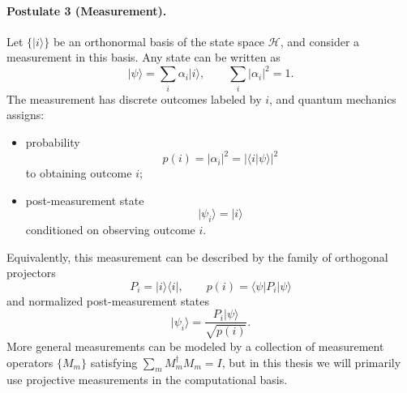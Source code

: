 \documentclass[12pt,a4paper,openany]{report}
\begin{document}
\paragraph{Postulate 3 (Measurement).}
Let $\{\lvert i \rangle\}$ be an orthonormal basis of the state space $\mathcal{H}$, and consider a measurement in this basis. Any state can be written as
\begin{equation}
  \lvert \psi \rangle = \sum_i \alpha_i \lvert i \rangle, \qquad \sum_i \lvert \alpha_i \rvert^2 = 1.
\end{equation}
The measurement has discrete outcomes labeled by $i$, and quantum mechanics assigns:
\begin{itemize}
  \item probability
  \begin{equation}
    p(i) = \lvert \alpha_i \rvert^2 = \lvert \langle i \vert \psi \rangle \rvert^2
  \end{equation}
  to obtaining outcome $i$;
  \item post-measurement state
  \begin{equation}
    \lvert \psi_i \rangle = \lvert i \rangle
  \end{equation}
  conditioned on observing outcome $i$.
\end{itemize}
Equivalently, this measurement can be described by the family of orthogonal projectors
\[
P_i = \lvert i \rangle \langle i \rvert, \qquad p(i) = \langle \psi \vert P_i \vert \psi \rangle
\]
and normalized post-measurement states
\[
\lvert \psi_i \rangle = \frac{P_i \lvert \psi \rangle}{\sqrt{p(i)}}.
\]
More general measurements can be modeled by a collection of measurement operators $\{M_m\}$ satisfying $\sum_m M_m^\dagger M_m = I$, but in this thesis we will primarily use projective measurements in the computational basis.
\end{document}
